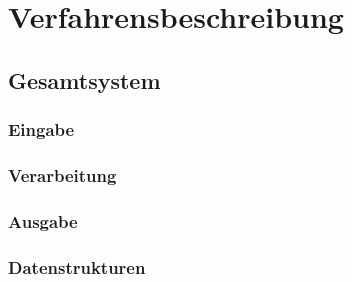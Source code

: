 \chapter{Verfahrensbeschreibung}\label{ch:verfahrensbeschreibung}

\section{Gesamtsystem}\label{sec:gesamtsystem}

\subsection{Eingabe}\label{subsec:eingabe}

\subsection{Verarbeitung}\label{subsec:verarbeitung}

\subsection{Ausgabe}\label{subsec:ausgabe}

\subsection{Datenstrukturen}\label{subsec:datenstrukt}
